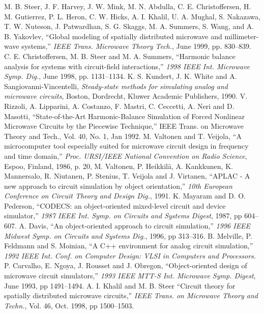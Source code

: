 \begin{thebibliography}{99}
%
 M. B. Steer, J. F. Harvey, J. W. Mink,
M. N. Abdulla, C. E. Christoffersen, H. M. Gutierrez, P. L. Heron,
C. W. Hicks, A. I. Khalil, U. A. Mughal, S. Nakazawa, T. W. Nuteson,
J. Patwardhan, S. G. Skaggs, M. A. Summers, S. Wang, and
A. B. Yakovlev, ``Global modeling of spatially distributed microwave
and millimeter-wave systems,'' \emph{IEEE Trans. Microwave Theory
Tech.}, June 1999, pp. 830--839.
%
 C. E. Christoffersen, M. B. Steer and M. A. Summers,
``Harmonic balance analysis for systems with circuit-field
interactions,'' \emph{1998 IEEE Int. Microwave Symp. Dig.}, June 1998,
pp. 1131--1134.
%
 K. S. Kundert, J. K. White and
A. Sangiovanni-Vincentelli, \emph{Steady-state methods for simulating
analog and microwave circuits}, Boston, Dordrecht, Kluwer Academic
Publishers, 1990.
%
 V. Rizzoli, A. Lipparini, A. Costanzo,
F. Mastri, C. Ceccetti, A. Neri and D. Masotti, ``State-of-the-Art
Harmonic-Balance Simulation of Forced Nonlinear Microwave Circuits by
the Piecewise Technique,'' IEEE Trans. on Microwave Theory and
Tech., Vol. 40, No. 1, Jan 1992.
%
 M. Valtonen and T. Veijola, ``A microcomputer tool
especially suited for microwave circuit design in frequency and time
domain,'' \emph{Proc. URSI/IEEE National Convention on Radio
Science}, Espoo, Finland, 1986, p. 20,
%
 M. Valtonen, P. Heikkil\"a, A. Kankkunen, K.
Mannersalo, R. Niutanen, P. Stenius, T. Veijola and J.  Virtanen,
``APLAC - A new approach to circuit simulation by object
orientation,'' \emph{10th European Conference on Circuit Theory and
Design Dig.}, 1991.
%
 K. Mayaram and D. O. Pederson, ``CODECS: an
object-oriented mixed-level circuit and device simulator,'' \emph{1987
IEEE Int. Symp. on Circuits and Systems Digest}, 1987, pp 604--607.
%
 A. Davis, ``An object-oriented approach to circuit
simulation,'' \emph{1996 IEEE Midwest Symp. on Circuits and
Systems Dig.}, 1996, pp 313--316.
%
 B. Melville, P. Feldmann and S. Moinian, ``A C++
environment for analog circuit simulation,'' \emph{1992 IEEE
Int. Conf. on Computer Design: VLSI in Computers and Processors.}
%
 P. Carvalho, E. Ngoya, J. Rousset and J. Obregon,
``Object-oriented design of microwave circuit simulators,'' \emph{1993
IEEE MTT-S Int. Microwave Symp. Digest}, June 1993, pp 1491--1494.
%
 A. I. Khalil and M. B. Steer
``Circuit theory for spatially distributed microwave circuits,''
\emph{IEEE Trans. on Microwave Theory and Techn.}, Vol. 46, Oct. 1998,
pp 1500--1503.


\end{thebibliography}
